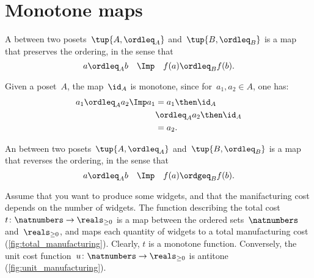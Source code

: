 
\section{Monotone maps}

\begin{definition}
  A \emph{} between two posets~$\tup{A, \ordleq_A}$ and~$\tup{B, \ordleq_B}$ is a map that preserves the ordering, in the sense that
  \begin{equation}
    a \ordleq_A b \quad \Imp \quad f(a) \ordleq_B f(b).
  \end{equation}
\end{definition}
\begin{remark}
  Given a poset~$A$, the map~$\id_A$ is monotone, since for~$a_1,a_2\in A$, one has:
  \begin{equation}
    \begin{aligned}
      a_1\ordleq_A a_2 \Imp a_1&=a_1\then \id_A\\
      &\ordleq_A a_2\then \id_A \\
      &= a_2.
    \end{aligned}
  \end{equation}
\end{remark}

\begin{definition}
  An \emph{} between two posets~$\tup{A, \ordleq_A}$ and~$\tup{B, \ordleq_B}$ is a map that reverses the ordering, in the sense that
  \begin{equation}
    a \ordleq_A b \quad \Imp \quad f(a) \ordgeq_B f(b).
  \end{equation}
\end{definition}


\begin{comment}
  A monotone map is an \emph{order isomorphism} if the other direction
  of the implication holds as well:
  \begin{equation}
    a \leq_A b \quad \Leftrightarrow \quad f(a) \leq_B f(b).
  \end{equation}
\end{comment}

\begin{example}
  Assume that you want to produce some widgets, and that the manifacturing cost depends on the number of widgets.
  The function describing the total cost~$t\colon \natnumbers\to \reals_{\geq 0}$ is a map between the ordered sets~$\natnumbers$ and~$\reals_{\geq 0}$, and maps each quantity of widgets to a total manufacturing cost (\cref{fig:total_manufacturing}).
  Clearly, $t$ is a monotone function.
  Conversely, the unit cost function~$u\colon \natnumbers\to \reals_{\geq 0}$ is antitone (\cref{fig:unit_manufacturing}).

\end{example}

